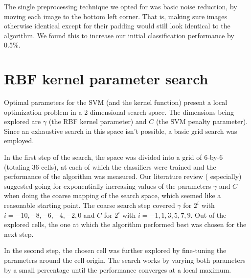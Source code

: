 \documentclass{netsec2012}
\begin{document}
The single preprocessing technique we opted for was basic noise reduction, by moving each image to
the bottom left corner.  That is, making sure images otherwise identical except for their padding
would still look identical to the algorithm.  We found this to increase our initial classification
performance by 0.5\%.


\section{RBF kernel parameter search}

\label{ref:kernelparamsearch}

Optimal parameters for the SVM (and the kernel function) present a local optimization problem in a
2-dimensional search space.  The dimensions being explored are $\gamma$ (the RBF kernel parameter)
and $C$ (the SVM penalty parameter).  Since an exhaustive search in this space isn't possible, a
basic grid search was employed.

In the first step of the search, the space was divided into a grid of 6-by-6 (totaling 36 cells), at
each of which the classifiers were trained and the performance of the algorithm was measured.  Our
literature review (\cite{libsvm_guide} especially) suggested going for exponentially increasing
values of the parameters $\gamma$ and $C$ when doing the coarse mapping of the search space, which
seemed like a reasonable starting point.  The coarse search step covered $\gamma$ for $2^i$ with $i
= -10, -8, -6, -4, -2, 0$ and $C$ for $2^i$ with $i = -1, 1, 3, 5, 7, 9$.  Out of the explored
cells, the one at which the algorithm performed best was chosen for the next step.

In the second step, the chosen cell was further explored by fine-tuning the parameters around the
cell origin.  The search works by varying both parameters by a small percentage until the
performance converges at a local maximum.

\label{ref:crossvalidation}
\end{document}
